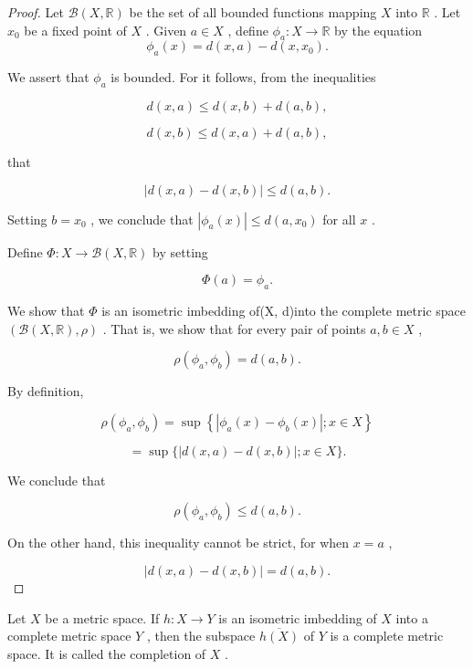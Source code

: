 \begin{proof}Let \(\mathcal{B}\left( {X,\mathbb{R}}\right)\) be the set of all bounded functions mapping \(X\) into \(\mathbb{R}\) . Let \({x}_{0}\) be a fixed point of \(X\) . Given \(a \in  X\) , define \({\phi }_{a} : X \rightarrow  \mathbb{R}\) by the equation
\[
{\phi }_{a}\left( x\right)  = d\left( {x,a}\right)  - d\left( {x,{x}_{0}}\right) .
\]

We assert that \({\phi }_{a}\) is bounded. For it follows, from the inequalities

\[
d\left( {x,a}\right)  \leq  d\left( {x,b}\right)  + d\left( {a,b}\right) ,
\]

\[
d\left( {x,b}\right)  \leq  d\left( {x,a}\right)  + d\left( {a,b}\right) ,
\]

that

\[
\left| {d\left( {x,a}\right)  - d\left( {x,b}\right) }\right|  \leq  d\left( {a,b}\right) .
\]

Setting \(b = {x}_{0}\) , we conclude that \(\left| {{\phi }_{a}\left( x\right) }\right|  \leq  d\left( {a,{x}_{0}}\right)\) for all \(x\) .

Define \(\Phi  : X \rightarrow  \mathcal{B}\left( {X,\mathbb{R}}\right)\) by setting

\[
\Phi \left( a\right)  = {\phi }_{a}.
\]

We show that \(\Phi\) is an isometric imbedding of(X, d)into the complete metric space \(\left( {\mathcal{B}\left( {X,\mathbb{R}}\right) ,\rho }\right)\) . That is, we show that for every pair of points \(a,b \in  X\) ,

\[
\rho \left( {{\phi }_{a},{\phi }_{b}}\right)  = d\left( {a,b}\right) .
\]

By definition,

\[
\rho \left( {{\phi }_{a},{\phi }_{b}}\right)  = \sup \left\{  {\left| {{\phi }_{a}\left( x\right)  - {\phi }_{b}\left( x\right) }\right| ;x \in  X}\right\}
\]

\[
= \sup \{ \left| {d\left( {x,a}\right)  - d\left( {x,b}\right) }\right| ;x \in  X\} .
\]

We conclude that

\[
\rho \left( {{\phi }_{a},{\phi }_{b}}\right)  \leq  d\left( {a,b}\right) .
\]

On the other hand, this inequality cannot be strict, for when \(x = a\) ,

\[
\left| {d\left( {x,a}\right)  - d\left( {x,b}\right) }\right|  = d\left( {a,b}\right) .
\]
\end{proof}
\begin{definition} Let \(X\) be a metric space. If \(h : X \rightarrow  Y\) is an isometric imbedding of \(X\) into a complete metric space \(Y\) , then the subspace \(\overline{h\left( X\right) }\) of \(Y\) is a complete metric space. It is called the completion of \(X\) .
\end{definition}


